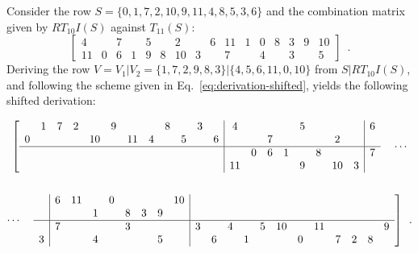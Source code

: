 \begin{example}
    \cite[216]{Starr1984}
    \label{ex:derivation-shifted}
    Consider the row $S = \{ 0, 1, 7, 2, 10, 9, 11, 4, 8, 5, 3, 6 \}$ and the combination matrix given by $RT_{10}I(S)$ against $T_{11}(S)$:
    \begin{equation}
        \left[
        \begin{array}{cccccccc|cccccccc}
            4 && 7 && 5 && 2 && 6 & 11 & 1 & 0 & 8 & 3 & 9 & 10 \\
            11 & 0 & 6 & 1 & 9 & 8 & 10 & 3 && 7 && 4 && 3 && 5
        \end{array}
        \right] \enspace.
    \end{equation}
    Deriving the row $V = V_1 | V_2 = \{ 1, 7, 2, 9, 8, 3 \} | \{ 4, 5, 6, 11, 0, 10 \}$ from $S | RT_{10}I(S)$, and following the scheme given in Eq.~\ref{eq:derivation-shifted}, yields the following shifted derivation:
    
    \begin{multline}
        \left[
        \begin{array}{cccccccccccc|cccccccc|c}
            & 1 & 7 & 2 && 9 &&& 8 && 3 && 4 &&&& 5 &&&& 6 \\
            0 &&&& 10 && 11 & 4 && 5 && 6 & && 7 &&&& 2 && \\
            \hline
            &&&&&&&&&&&& & 0 & 6 & 1 && 8 &&& 7 \\
            &&&&&&&&&&&& 11 &&&& 9 && 10 & 3 &
        \end{array}
        \right. \quad \cdots \\\\
        \cdots \quad \left. \begin{array}{c|cccccccc|cccccccccccc}
            & 6 & 11 && 0 &&&& 10 &&&&&&&&&&& \\
            & && 1 && 8 & 3 & 9 & &&&&&&&&&&& \\
            \hline
            & 7 &&&& 3 &&& & 3 && 4 && 5 & 10 && 11 &&&& 9 \\
            3 &&& 4 &&&& 5 & && 6 && 1 &&& 0 && 7 & 2 & 8
        \end{array} \right] \enspace.
    \end{multline}
\end{example}

